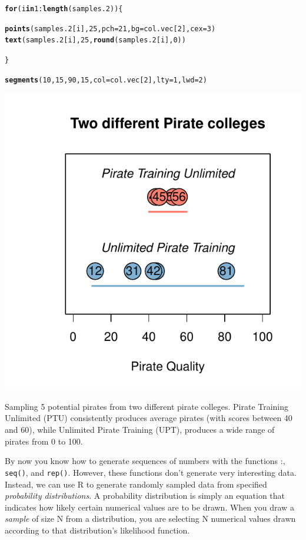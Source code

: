 \documentclass{tufte-book}\usepackage[]{graphicx}\usepackage[]{color}
\makeatletter
\def\maxwidth{ %
  \ifdim\Gin@nat@width>\linewidth
    \linewidth
  \else
    \Gin@nat@width
  \fi
}
\newcommand{\hlnum}[1]{\textcolor[rgb]{0.686,0.059,0.569}{#1}}%
\newcommand{\hlopt}[1]{\textcolor[rgb]{0,0,0}{#1}}%
\newcommand{\hlstd}[1]{\textcolor[rgb]{0.345,0.345,0.345}{#1}}%
\newcommand{\hlkwa}[1]{\textcolor[rgb]{0.161,0.373,0.58}{\textbf{#1}}}%
\newcommand{\hlkwc}[1]{\textcolor[rgb]{0.333,0.667,0.333}{#1}}%
\newcommand{\hlkwd}[1]{\textcolor[rgb]{0.737,0.353,0.396}{\textbf{#1}}}%
\newenvironment{kframe}{%
 \def\at@end@of@kframe{}%
 \ifinner\ifhmode%
  \def\at@end@of@kframe{\end{minipage}}%
  \begin{minipage}{\columnwidth}%
 \fi\fi%
 \def\FrameCommand##1{\hskip\@totalleftmargin \hskip-\fboxsep
 \colorbox{shadecolor}{##1}\hskip-\fboxsep
     \hskip-\linewidth \hskip-\@totalleftmargin \hskip\columnwidth}%
 \MakeFramed {\advance\hsize-\width
   \@totalleftmargin\z@ \linewidth\hsize
   \@setminipage}}%
 {\par\unskip\endMakeFramed%
 \at@end@of@kframe}
\newenvironment{knitrout}{}{} %
\makeatother
\begin{document}
\begin{marginfigure}
\begin{tiny}
\begin{knitrout}
\begin{kframe}
\begin{alltt}
\hlkwa{for}\hlstd{(i} \hlkwa{in} \hlnum{1}\hlopt{:}\hlkwd{length}\hlstd{(samples.2)) \{}

  \hlkwd{points}\hlstd{(samples.2[i],} \hlnum{25}\hlstd{,} \hlkwc{pch} \hlstd{=} \hlnum{21}\hlstd{,} \hlkwc{bg} \hlstd{= col.vec[}\hlnum{2}\hlstd{],} \hlkwc{cex} \hlstd{=} \hlnum{3}\hlstd{)}
  \hlkwd{text}\hlstd{(samples.2[i],} \hlnum{25}\hlstd{,} \hlkwd{round}\hlstd{(samples.2[i],} \hlnum{0}\hlstd{))}

\hlstd{\}}

\hlkwd{segments}\hlstd{(}\hlnum{10}\hlstd{,} \hlnum{15}\hlstd{,} \hlnum{90}\hlstd{,} \hlnum{15}\hlstd{,} \hlkwc{col} \hlstd{= col.vec[}\hlnum{2}\hlstd{],} \hlkwc{lty} \hlstd{=} \hlnum{1}\hlstd{,} \hlkwc{lwd} \hlstd{=} \hlnum{2}\hlstd{)}
\end{alltt}
\end{kframe}
\includegraphics[width=\maxwidth]{figure/unnamed-chunk-35-1} 

\end{knitrout}
\end{tiny}
\caption{Sampling 5 potential pirates from two different pirate colleges. Pirate Training Unlimited (PTU) consistently produces average pirates (with scores between 40 and 60), while Unlimited Pirate Training (UPT), produces a wide range of pirates from 0 to 100.}
\label{fig:piratecollege}
\end{marginfigure}
By now you know how to generate sequences of numbers with the functions :, \texttt{seq()}, and \texttt{rep()}. However, these functions don't generate very interesting data. Instead, we can use R to generate randomly sampled data from specified \textit{probability distributions}. A probability distribution is simply an equation that indicates how likely certain numerical values are to be drawn. When you draw a \textit{sample} of size N from a distribution, you are selecting N numerical values drawn according to that distribution's likelihood function.
\end{document}
